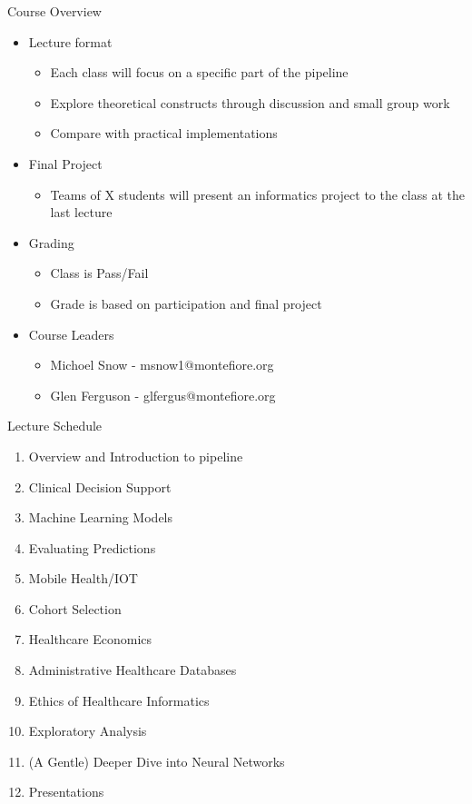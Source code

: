 \documentclass[10pt]{beamer}
\begin{document}
\begin{frame}{Course Overview}
	\begin{itemize}
		\item Lecture format 
		\begin{itemize}
			\item Each class will focus on a specific part of the pipeline
			\item Explore theoretical constructs through discussion and small group work
			\item Compare with practical implementations
		\end{itemize}	
		\item Final Project
		\begin{itemize}
			\item Teams of X students will present an informatics project to the class at the last lecture
		\end{itemize}
		\item Grading
		\begin{itemize}
			\item Class is Pass/Fail
			\item Grade is based on participation and final project 
		\end{itemize}		
		\item Course Leaders
		\begin{itemize}
			\item Michoel Snow - msnow1@montefiore.org
			\item Glen Ferguson - glfergus@montefiore.org
		\end{itemize}
	\end{itemize}
\end{frame}



\begin{frame}{Lecture Schedule}
	\begin{enumerate}
		\item Overview and Introduction to pipeline
		\item Clinical Decision Support
		\item Machine Learning Models
		\item Evaluating Predictions
		\item Mobile Health/IOT
		\item Cohort Selection
		\item Healthcare Economics
		\item Administrative Healthcare Databases
		\item Ethics of Healthcare Informatics
		\item Exploratory Analysis
		\item (A Gentle) Deeper Dive into Neural Networks
		\item Presentations
	\end{enumerate}
\end{frame}
\end{document}
